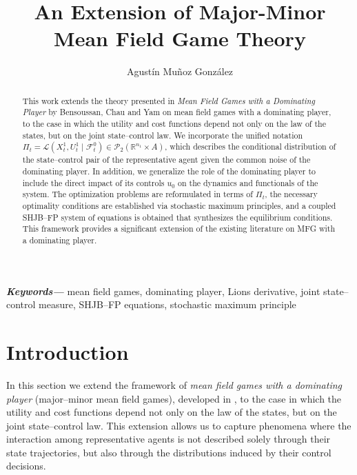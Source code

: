 \documentclass[12pt]{article}
\theoremstyle{definition}
\newcommand{\keywords}[1]{\textbf{\textit{Keywords---}} #1}
\begin{document}
\title{An Extension of Major-Minor Mean Field Game Theory}

\author[1]{Agust\'in Mu\~noz Gonz\'alez}


\maketitle


\begin{abstract}
This work extends the theory presented in \textit{Mean Field Games with a Dominating Player} by Bensoussan, Chau and Yam \cite{bensoussan2014mfgdominating} on mean field games with a dominating player, to the case in which the utility and cost functions depend not only on the law of the states, but on the joint state--control law. We incorporate the unified notation $\Pi_t = \mathcal{L}(X_t^1, U_t^1 \mid \mathcal{F}_t^0) \in \mathcal{P}_2(\mathbb{R}^{n_1} \times A)$, which describes the conditional distribution of the state--control pair of the representative agent given the common noise of the dominating player. In addition, we generalize the role of the dominating player to include the direct impact of its controls $u_0$ on the dynamics and functionals of the system. The optimization problems are reformulated in terms of $\Pi_t$, the necessary optimality conditions are established via stochastic maximum principles, and a coupled SHJB--FP system of equations is obtained that synthesizes the equilibrium conditions. This framework provides a significant extension of the existing literature on MFG with a dominating player.
\end{abstract}
\keywords{mean field games, dominating player, Lions derivative, joint state--control measure, SHJB--FP equations, stochastic maximum principle}
\hspace{10pt}
\clearpage
\tableofcontents
\clearpage
\section{Introduction}

In this section we extend the framework of \textit{mean field games with a dominating player} (major--minor mean field games), developed in \cite{bensoussan2014mfgdominating}, to the case in which the utility and cost functions depend not only on the law of the states, but on the joint state--control law. This extension allows us to capture phenomena where the interaction among representative agents is not described solely through their state trajectories, but also through the distributions induced by their control decisions.
\end{document}
